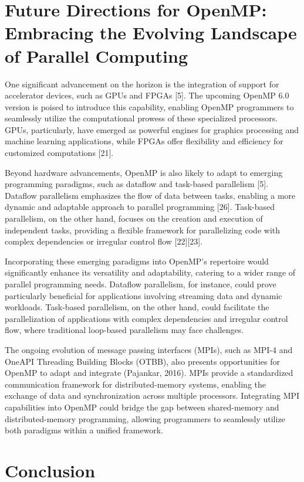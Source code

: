 \documentclass[12pt,conference]{IEEEtran}
\begin{document}
\section{Future Directions for OpenMP: Embracing the Evolving Landscape of Parallel Computing}

One significant advancement on the horizon is the integration of support for accelerator devices, such as GPUs and FPGAs [5]. The upcoming OpenMP 6.0 version is poised to introduce this capability, enabling OpenMP programmers to seamlessly utilize the computational prowess of these specialized processors. GPUs, particularly, have emerged as powerful engines for graphics processing and machine learning applications, while FPGAs offer flexibility and efficiency for customized computations [21].

Beyond hardware advancements, OpenMP is also likely to adapt to emerging programming paradigms, such as dataflow and task-based parallelism [5]. Dataflow parallelism emphasizes the flow of data between tasks, enabling a more dynamic and adaptable approach to parallel programming [26]. Task-based parallelism, on the other hand, focuses on the creation and execution of independent tasks, providing a flexible framework for parallelizing code with complex dependencies or irregular control flow [22][23].

Incorporating these emerging paradigms into OpenMP's repertoire would significantly enhance its versatility and adaptability, catering to a wider range of parallel programming needs. Dataflow parallelism, for instance, could prove particularly beneficial for applications involving streaming data and dynamic workloads. Task-based parallelism, on the other hand, could facilitate the parallelization of applications with complex dependencies and irregular control flow, where traditional loop-based parallelism may face challenges.

The ongoing evolution of message passing interfaces (MPIs), such as MPI-4 and OneAPI Threading Building Blocks (OTBB), also presents opportunities for OpenMP to adapt and integrate (Pajankar, 2016). MPIs provide a standardized communication framework for distributed-memory systems, enabling the exchange of data and synchronization across multiple processors. Integrating MPI capabilities into OpenMP could bridge the gap between shared-memory and distributed-memory programming, allowing programmers to seamlessly utilize both paradigms within a unified framework.

\section{Conclusion}
\end{document}
